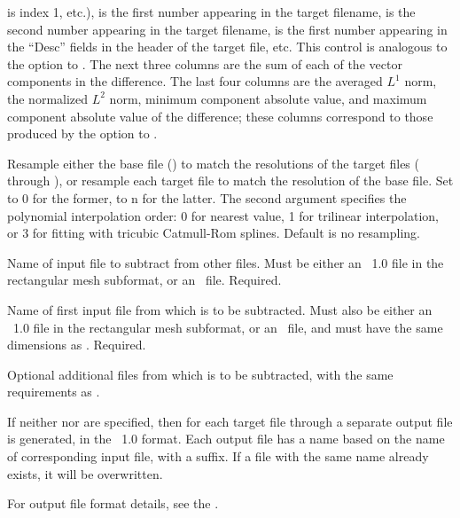 \begin{description}
  is index 1, etc.),  is the first number appearing in the
  target filename,  is the second number appearing in the target
  filename,  is the first number appearing in the ``Desc''
  fields in the header of the target file, etc.  This control is
  analogous to the  option to
  .
  The next three columns are the sum of each of the vector components in
  the difference.  The last four columns are the averaged $L^1$ norm,
  the normalized $L^2$ norm, minimum component absolute value, and
  maximum component absolute value of the difference; these columns
  correspond to those produced by the  option to
  .
\item[\optkey{-resample \boa 0\pipe n\bca\  \boa 0\pipe 1\pipe 3\bca}]
  Resample either the base file () to match the resolutions of
  the target files ( through ), or resample each
  target file to match the resolution of the base file.  Set
   to 0 for the former, to n for the latter.  The second
  argument specifies the polynomial interpolation order: 0 for
  nearest value, 1 for trilinear interpolation, or 3 for fitting with
  tricubic Catmull-Rom splines.  Default is no resampling.
\item[\optkey{file-0}]
  Name of input file to subtract from other files.  Must be either
  an \OVF\ 1.0 file in the rectangular mesh subformat, or an \VIO\
  file.  Required.
\item[\optkey{file-1}]
  Name of first input file from which  is to be subtracted.
  Must also be either an \OVF\ 1.0 file in the rectangular mesh
  subformat, or an \VIO\ file, and must have the same dimensions as
  \cd{file-0}.  Required.
\item[\optkey{\ldots\ file-n}]
  Optional additional files from which  is to be
  subtracted, with the same requirements as .
\end{description}

If neither  nor  are specified, then for each target
file \cd{file-1} through \cd{file-n} a separate output file is
generated, in the \OVF\ 1.0 format.  Each output file has a name based
on the name of corresponding input file, with a \cd{-diff} suffix.  If a
file with the same name already exists, it will be overwritten.

For output file format details, see the .

